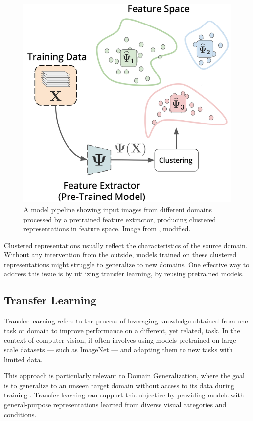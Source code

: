 \begin{figure}[!htb]
    \centering
    \includegraphics[height=0.33\textheight]{images/Pipeline-Feature_Space.png}
    \caption{A model pipeline showing input images from different domains processed by a pretrained feature extractor, producing clustered representations in feature space. Image from \cite{thomasWhatsLatentLeveraging2025}, modified.}
    \label{fig:Pipeline_Feature_Space}
\end{figure}
Clustered representations usually reflect the characteristics of the source domain. Without any intervention from the outside, models trained on these clustered representations might struggle to generalize to new domains.
One effective way to address this issue is by utilizing transfer learning, by reusing pretrained models.
\subsection{Transfer Learning}
Transfer learning refers to the process of leveraging knowledge obtained from one task or domain to improve performance on a different, yet related, task. In the context of computer vision, it often involves using models pretrained on large-scale datasets — such as ImageNet — and adapting them to new tasks with limited data.

This approach is particularly relevant to Domain Generalization, where the goal is to generalize to an unseen target domain without access to its data during training \cite{gulrajaniSearchLostDomain2020,liDeeperBroaderArtier2017}. Transfer learning can support this objective by providing models with general-purpose representations learned from diverse visual categories and conditions.

